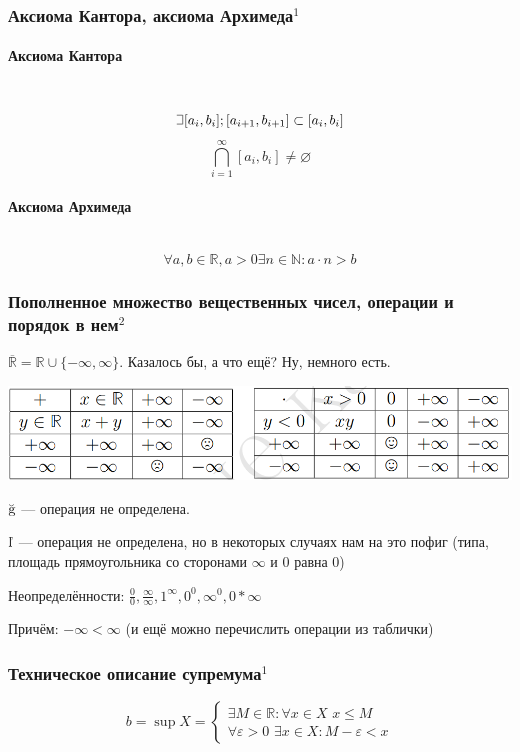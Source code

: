 \documentclass{article}
\def\letus{%
\mathord{\setbox0=\hbox{$\exists$}%
         \hbox{\kern 0.125\wd0%
               \vbox to \ht0{%
                  \hrule width 0.75\wd0%
                  \vfill%
                  \hrule width 0.75\wd0}%
               \vrule height \ht0%
               \kern 0.125\wd0}%
       }%
        }
\def\dbl{\,\,}
\let\vanillaparagraph\paragraph
\renewcommand{\paragraph}[1]{\vanillaparagraph{#1}\mbox{}\\}
\begin{document}
\subsubsection{Аксиома Кантора, аксиома Архимеда\texorpdfstring{$^1$}{}}
\paragraph{Аксиома Кантора}
$$\letus [a_i, b_i]; [a_{i+1}, b_{i+1}] \subset [a_i, b_i]$$
$$
\bigcap_{i=1}^\infty [a_i, b_i] \ne \varnothing
$$

\paragraph{Аксиома Архимеда}
$$
\forall a, b \in \mathbb{R}, a > 0 \exists n \in \mathbb{N} : a\cdot n > b
$$

\subsubsection{Пополненное множество вещественных чисел, операции и порядок в нем\texorpdfstring{$^2$}{}}

$\overline{\mathbb{R}} = \mathbb{R} \cup \{-\infty, \infty\}$. Казалось бы, а что ещё? Ну, немного есть.

\includegraphics[scale=0.55]{../images/added_R.png}

$\Frowny$ --- операция не определена.

$\Smiley$ --- операция не определена, но в некоторых случаях нам на это пофиг (типа, площадь прямоугольника со сторонами $\infty$ и 0 равна 0)

Неопределённости: $\frac{0}{0}, \frac{\infty}{\infty}, 1^\infty, 0^0, \infty^0, 0 * \infty$

Причём: $-\infty < \infty$ (и ещё можно перечислить операции из таблички)

\subsubsection{Техническое описание супремума\texorpdfstring{$^1$}{}}
$$
b = \sup X = 
\begin{cases}
\exists M \in \mathbb{R} : \forall x \in X \dbl x \le M\\
\forall \varepsilon > 0 \dbl \exists x \in X : M - \varepsilon < x
\end{cases} 
$$
\end{document}
